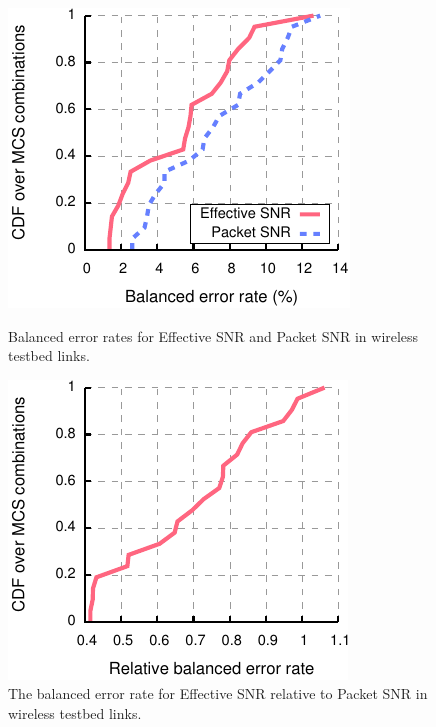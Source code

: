 \begin{figure}[htbp]
  \begin{minipage}{0.48\textwidth}
  \centering
  \includegraphics[width=\textwidth]{figures/delivery/goodbad/error_rates.pdf}
  \caption[Balanced error rates for Effective SNR and Packet SNR]{Balanced error rates for Effective SNR and Packet SNR in wireless testbed links.}
  \label{fig:balanced_error}
  \end{minipage}
  \hfill
  \begin{minipage}{0.48\textwidth}
  \centering
  \includegraphics[width=\textwidth]{figures/delivery/goodbad/error_ratio.pdf}
  \caption[Balanced error rate for Effective SNR relative to Packet SNR]{The balanced error rate for Effective SNR relative to Packet SNR in wireless testbed links.}
  \label{fig:balanced_error_ratio}
  \end{minipage}
\end{figure}
